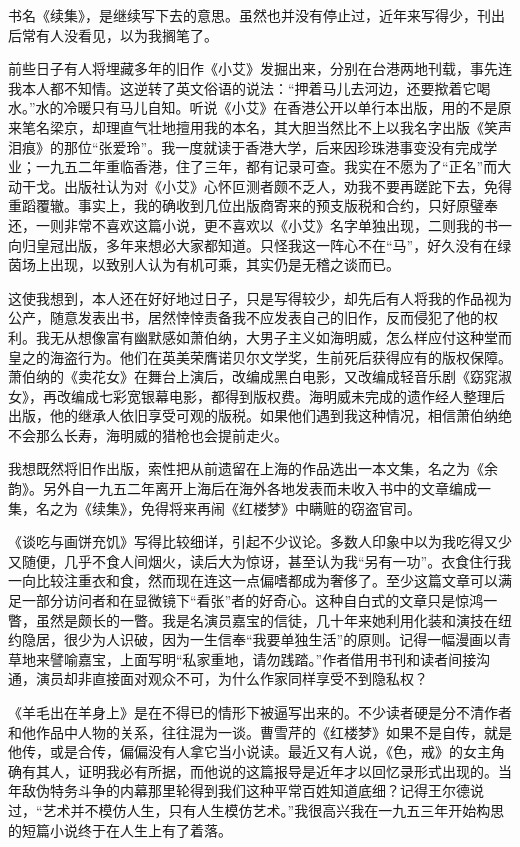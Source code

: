 \par 书名《续集》，是继续写下去的意思。虽然也并没有停止过，近年来写得少，刊出后常有人没看见，以为我搁笔了。
\par 前些日子有人将埋藏多年的旧作《小艾》发掘出来，分别在台港两地刊载，事先连我本人都不知情。这逆转了英文俗语的说法：“押着马儿去河边，还要揿着它喝水。”水的冷暖只有马儿自知。听说《小艾》在香港公开以单行本出版，用的不是原来笔名梁京，却理直气壮地擅用我的本名，其大胆当然比不上以我名字出版《笑声泪痕》的那位“张爱玲”。我一度就读于香港大学，后来因珍珠港事变没有完成学业；一九五二年重临香港，住了三年，都有记录可查。我实在不愿为了“正名”而大动干戈。出版社认为对《小艾》心怀叵测者颇不乏人，劝我不要再蹉跎下去，免得重蹈覆辙。事实上，我的确收到几位出版商寄来的预支版税和合约，只好原璧奉还，一则非常不喜欢这篇小说，更不喜欢以《小艾》名字单独出现，二则我的书一向归皇冠出版，多年来想必大家都知道。只怪我这一阵心不在“马”，好久没有在绿茵场上出现，以致别人认为有机可乘，其实仍是无稽之谈而已。
\par 这使我想到，本人还在好好地过日子，只是写得较少，却先后有人将我的作品视为公产，随意发表出书，居然悻悻责备我不应发表自己的旧作，反而侵犯了他的权利。我无从想像富有幽默感如萧伯纳，大男子主义如海明威，怎么样应付这种堂而皇之的海盗行为。他们在英美荣膺诺贝尔文学奖，生前死后获得应有的版权保障。萧伯纳的《卖花女》在舞台上演后，改编成黑白电影，又改编成轻音乐剧《窈窕淑女》，再改编成七彩宽银幕电影，都得到版权费。海明威未完成的遗作经人整理后出版，他的继承人依旧享受可观的版税。如果他们遇到我这种情况，相信萧伯纳绝不会那么长寿，海明威的猎枪也会提前走火。
\par 我想既然将旧作出版，索性把从前遗留在上海的作品选出一本文集，名之为《余韵》。另外自一九五二年离开上海后在海外各地发表而未收入书中的文章编成一集，名之为《续集》，免得将来再闹《红楼梦》中瞒赃的窃盗官司。
\par 《谈吃与画饼充饥》写得比较细详，引起不少议论。多数人印象中以为我吃得又少又随便，几乎不食人间烟火，读后大为惊讶，甚至认为我“另有一功”。衣食住行我一向比较注重衣和食，然而现在连这一点偏嗜都成为奢侈了。至少这篇文章可以满足一部分访问者和在显微镜下“看张”者的好奇心。这种自白式的文章只是惊鸿一瞥，虽然是颇长的一瞥。我是名演员嘉宝的信徒，几十年来她利用化装和演技在纽约隐居，很少为人识破，因为一生信奉“我要单独生活”的原则。记得一幅漫画以青草地来譬喻嘉宝，上面写明“私家重地，请勿践踏。”作者借用书刊和读者间接沟通，演员却非直接面对观众不可，为什么作家同样享受不到隐私权？
\par 《羊毛出在羊身上》是在不得已的情形下被逼写出来的。不少读者硬是分不清作者和他作品中人物的关系，往往混为一谈。曹雪芹的《红楼梦》如果不是自传，就是他传，或是合传，偏偏没有人拿它当小说读。最近又有人说，《色，戒》的女主角确有其人，证明我必有所据，而他说的这篇报导是近年才以回忆录形式出现的。当年敌伪特务斗争的内幕那里轮得到我们这种平常百姓知道底细？记得王尔德说过，“艺术并不模仿人生，只有人生模仿艺术。”我很高兴我在一九五三年开始构思的短篇小说终于在人生上有了着落。
